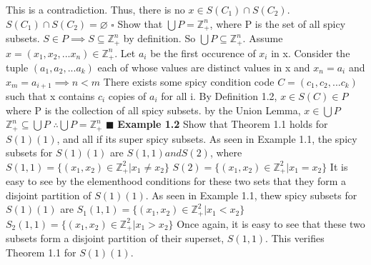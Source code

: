 \documentclass[12pt]{article}
\begin{document}
This is a contradiction. \newline
Thus, there is no \(x\in S(C_1)\cap S(C_2)\).
\newline
\(S(C_1)\cap S(C_2) = \varnothing\)
\newline \(\square\) \newline
Show that \(\bigcup P =\mathbb{Z}_+^n\), where P is the set of all spicy subsets.
\newline
\newline
\(S\in P \implies S \subseteq \mathbb{Z}_+^n\) by definition. So \(\bigcup P \subseteq \mathbb{Z}_+^n\).
\newline
Assume \(x = (x_1,x_2,...x_n) \in \mathbb{Z}_+^n\).
\newline
Let \(a_i\) be the first occurence of \(x_i\) in x.
\newline
Consider the tuple \((a_1,a_2,...a_k)\) each of whose values are distinct values in x and \(x_n = a_i\) and \(x_m = a_{i+1} \implies n < m\)
\newline
There exists some spicy condition code \(C=(c_1,c_2,...c_k)\) such that x contains \(c_i\) copies of \(a_i\) for all i.
\newline
By Definition 1.2, \(x \in S(C) \in P\) where P is the collection of all spicy subsets.
\newline
by the Union Lemma, \(x \in \bigcup P\)
\newline
\(\mathbb{Z}_+^n \subseteq \bigcup P\)
\newline
\(\therefore \bigcup P = \mathbb{Z}_+^n\)
\newline \(\blacksquare\) \newline \newline
\textbf{Example 1.2} \newline
Show that Theorem 1.1 holds for \(S(1)(1)\), and all if its super spicy subsets. \newline \newline
As seen in Example 1.1, the spicy subsets for \(S(1)(1)\) are \(S(1,1) and S(2)\), where \newline
\(S(1,1)=\{(x_1,x_2)\in \mathbb{Z}_+^2 | x_1 \neq x_2\}\) \newline
\newline
\(S(2)=\{(x_1,x_2)\in \mathbb{Z}_+^2 | x_1 = x_2\}\) \newline
It is easy to see by the elementhood conditions for these two sets that they form a disjoint partition of \(S(1)(1)\).
\newline \newline
As seen in Example 1.1, thew spicy subsets for \(S(1)(1)\) are
\newline
\(S_1(1,1)=\{(x_1,x_2)\in \mathbb{Z}_+^2 | x_1 < x_2\}\) \newline
\newline
\(S_2(1,1)=\{(x_1,x_2)\in \mathbb{Z}_+^2 | x_1 > x_2\}\) \newline
Once again, it is easy to see that these two subsets form a disjoint partition of their superset, \(S(1,1)\). \newline
\newline
This verifies Theorem 1.1 for \(S(1)(1)\). \newline
\end{document}
